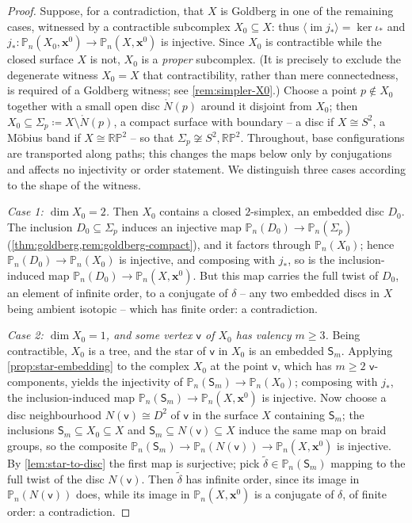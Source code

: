 \documentclass[reqno]{amsart}
\theoremstyle{definition}
\newcommand\bfx{\mathbf{x}}
\newcommand\sfS{\mathsf{S}}
\newcommand\sfv{\mathsf{v}}
\newcommand{\PB}{\mathbb{P}}
\newcommand{\im}{\operatorname{im}}
\newcommand{\RP}{\mathbb{RP}}
\newcommand{\co}[1]{\mathopen{\langle}#1\mathclose{\rangle}} %
\newcommand{\base}{\bfx^0}
\renewcommand{\tilde}{\widetilde}
\numberwithin{equation}{section}
\begin{document}
\begin{proof}
Suppose, for a contradiction, that \(X\) is Goldberg in one of
the remaining cases, witnessed by a contractible subcomplex
\(X_0\subseteq X\): thus \(\co{\im j_\ast}=\ker\iota_\ast\) and
\(j_\ast\colon\PB_n(X_0,\base)\to\PB_n(X,\base)\) is injective.
Since \(X_0\) is contractible while the closed surface \(X\) is
not, \(X_0\) is a \emph{proper} subcomplex. (It is precisely to
exclude the degenerate witness \(X_0=X\) that contractibility,
rather than mere connectedness, is required of a Goldberg
witness; see \cref{rem:simpler-X0}.) Choose a point
\(p\notin X_0\) together with a small open disc
\(\mathring N(p)\) around it disjoint from \(X_0\); then
\(X_0\subseteq\Sigma_p\coloneqq X\setminus\mathring N(p)\), a
compact surface with boundary -- a disc if \(X\cong S^2\), a
M\"obius band if \(X\cong\RP^2\) -- so that
\(\Sigma_p\not\cong S^2,\RP^2\). Throughout, base
configurations are transported along paths; this changes the
maps below only by conjugations and affects no injectivity or
order statement. We distinguish three cases according to the
shape of the witness.

\emph{Case 1: \(\dim X_0=2\).} Then \(X_0\) contains a closed
\(2\)-simplex, an embedded disc \(D_0\). The inclusion
\(D_0\subseteq\Sigma_p\) induces an injective map
\(\PB_n(D_0)\to\PB_n(\Sigma_p)\)
(\cref{thm:goldberg,rem:goldberg-compact}), and it factors
through \(\PB_n(X_0)\); hence \(\PB_n(D_0)\to\PB_n(X_0)\) is
injective, and composing with \(j_\ast\), so is the
inclusion-induced map \(\PB_n(D_0)\to\PB_n(X,\base)\). But this
map carries the full twist of \(D_0\), an element of infinite
order, to a conjugate of \(\delta\) -- any two embedded discs
in \(X\) being ambient isotopic -- which has finite order: a
contradiction.

\emph{Case 2: \(\dim X_0=1\), and some vertex \(\sfv\) of
\(X_0\) has valency \(m\geq3\).} Being contractible, \(X_0\) is
a tree, and the star of \(\sfv\) in \(X_0\) is an embedded
\(\sfS_m\). Applying \cref{prop:star-embedding} to the complex
\(X_0\) at the point \(\sfv\), which has \(m\geq2\)
\(\sfv\)-components, yields the injectivity of
\(\PB_n(\sfS_m)\to\PB_n(X_0)\); composing with \(j_\ast\), the
inclusion-induced map \(\PB_n(\sfS_m)\to\PB_n(X,\base)\) is
injective. Now choose a disc neighbourhood
\(N(\sfv)\cong D^2\) of \(\sfv\) in the surface \(X\)
containing \(\sfS_m\); the inclusions
\(\sfS_m\subseteq X_0\subseteq X\) and
\(\sfS_m\subseteq N(\sfv)\subseteq X\) induce the same map on
braid groups, so the composite
\(\PB_n(\sfS_m)\to\PB_n(N(\sfv))\to\PB_n(X,\base)\) is
injective. By \cref{lem:star-to-disc} the first map is
surjective; pick \(\tilde\delta\in\PB_n(\sfS_m)\) mapping to
the full twist of the disc \(N(\sfv)\). Then \(\tilde\delta\)
has infinite order, since its image in \(\PB_n(N(\sfv))\)
does, while its image in \(\PB_n(X,\base)\) is a conjugate of
\(\delta\), of finite order: a contradiction.


\end{proof}
\end{document}
